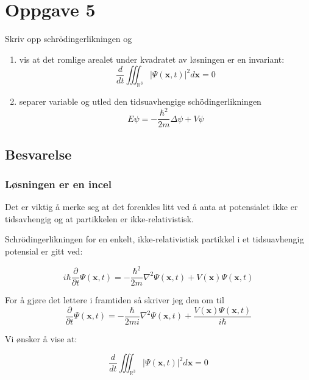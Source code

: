 \section{Oppgave 5}
Skriv opp schrödingerlikningen og
\begin{enumerate}
    \item vis at det romlige arealet under kvadratet av løsningen er en invariant: 
    \begin{equation*}  
        \frac{d}{d t} \iiint_{\mathbb{R}^{3}}|\Psi(\mathbf{x}, t)|^{2} d \mathbf{x}=0    
    \end{equation*}
    \item separer variable og utled den tidsuavhengige schödingerlikningen
    \begin{equation*} 
        E \psi=-\frac{\hbar^{2}}{2 m} \Delta \psi+V \psi    
    \end{equation*}
\end{enumerate}

\subsection*{Besvarelse}
\subsubsection*{Løsningen er en incel}

Det er viktig å merke seg at det forenkles litt ved å anta at potensialet ikke er tidsavhengig og at partikkelen er ikke-relativistisk.

Schrödingerlikningen for en enkelt, ikke-relativistisk partikkel i et tidsuavhengig potensial er gitt ved:

\begin{equation*}
    i\hbar\frac{\partial}{\partial t}\Psi(\mathbf{x},t) = -\frac{\hbar^2}{2m}\nabla^2\Psi(\mathbf{x},t) + V(\mathbf{x})\Psi(\mathbf{x},t)
\end{equation*}

For å gjøre det lettere i framtiden så skriver jeg den om til 
\begin{equation*}
    \frac{\partial}{\partial t}\Psi(\mathbf{x},t) = -\frac{\hbar}{2mi}\nabla^2\Psi(\mathbf{x},t) + \frac{V(\mathbf{x})\Psi(\mathbf{x},t)}{i\hbar}
\end{equation*}

Vi ønsker å vise at:

\begin{equation*}
    \frac{d}{d t} \iiint_{\mathbb{R}^{3}}|\Psi(\mathbf{x}, t)|^{2} d \mathbf{x}=0
\end{equation*}

